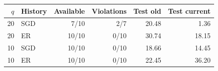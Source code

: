 \begin{tabular}{rlrrrr}
\toprule
$q$ & History & Available & Violations & Test old & Test current \\
\midrule
20 & SGD & 7/10 & 2/7 & 20.48 & 1.36 \\
20 & ER & 10/10 & 0/10 & 30.74 & 18.15 \\
10 & SGD & 10/10 & 0/10 & 18.66 & 14.45 \\
10 & ER & 10/10 & 0/10 & 22.45 & 36.20 \\
\bottomrule
\end{tabular}
